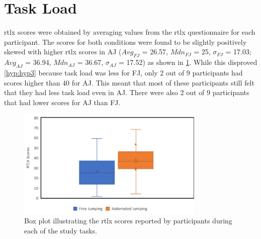 \section{Task Load}
\label{subsection EUS: Task Load}
\acrshort{rtlx} scores were obtained by averaging values from the \acrshort{rtlx} questionnaire for each participant. The scores for both conditions were found to be slightly positively skewed with higher \acrshort{rtlx} scores in AJ ($Avg_{FJ}$ = 26.57, $Mdn_{FJ}$ = 25, $\sigma_{FJ}$ = 17.03; $Avg_{AJ}$ = 36.94, $Mdn_{AJ}$ = 36.67, $\sigma_{AJ}$ = 17.52) as shown in \cref{fig:task-load}. While this disproved \cref{hyp:hyp3} because task load was less for FJ, only 2 out of 9 participants had scores higher than 40 for AJ. This meant that most of these participants still felt that they had less task load even in AJ. There were also 2 out of 9 participants that had lower scores for AJ than FJ.  
\begin{figure}[]
	\centering
	\includegraphics[width=0.8\textwidth]{images/task-load.pdf}
	\caption{Box plot illustrating the \acrshort{rtlx} scores reported by participants during each of the study tasks.}
	\label{fig:task-load}
\end{figure}
